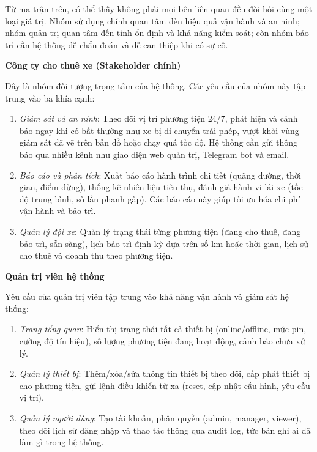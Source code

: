 \documentclass[a4paper]{extarticle}
\providecommand{\tightlist}{%
  \setlength{\itemsep}{0pt}\setlength{\parskip}{0pt}}
\begin{document}
Từ ma trận trên, có thể thấy không phải mọi bên liên quan đều đòi hỏi cùng
một loại giá trị. Nhóm sử dụng chính quan tâm đến hiệu quả vận hành và an
ninh; nhóm quản trị quan tâm đến tính ổn định và khả năng kiểm soát; còn
nhóm bảo trì cần hệ thống dễ chẩn đoán và dễ can thiệp khi có sự cố.

\textbf{Công ty cho thuê xe (Stakeholder chính)}

Đây là nhóm đối tượng trọng tâm của hệ thống. Các yêu cầu của nhóm này
tập trung vào ba khía cạnh:

\begin{enumerate}
\def\labelenumi{\arabic{enumi}.}
\tightlist
\item
  \emph{Giám sát và an ninh}: Theo dõi vị trí phương tiện 24/7, phát
  hiện và cảnh báo ngay khi có bất thường như xe bị di chuyển trái phép,
  vượt khỏi vùng giám sát đã vẽ trên bản đồ hoặc chạy quá tốc độ. Hệ
  thống cần gửi thông báo qua nhiều kênh như giao diện web quản trị,
  Telegram bot và email.
\item
  \emph{Báo cáo và phân tích}: Xuất báo cáo hành trình chi tiết (quãng
  đường, thời gian, điểm dừng), thống kê nhiên liệu tiêu thụ, đánh giá
  hành vi lái xe (tốc độ trung bình, số lần phanh gấp). Các báo cáo này
  giúp tối ưu hóa chi phí vận hành và bảo trì.
\item
  \emph{Quản lý đội xe}: Quản lý trạng thái từng phương tiện (đang cho
  thuê, đang bảo trì, sẵn sàng), lịch bảo trì định kỳ dựa trên số km
  hoặc thời gian, lịch sử cho thuê và doanh thu theo phương tiện.
\end{enumerate}

\textbf{Quản trị viên hệ thống}

Yêu cầu của quản trị viên tập trung vào khả năng vận hành và giám sát hệ
thống:

\begin{enumerate}
\def\labelenumi{\arabic{enumi}.}
\tightlist
\item
  \emph{Trang tổng quan}: Hiển thị trạng thái tất cả thiết bị
  (online/offline, mức pin, cường độ tín hiệu), số lượng phương tiện
  đang hoạt động, cảnh báo chưa xử lý.
\item
  \emph{Quản lý thiết bị}: Thêm/xóa/sửa thông tin thiết bị theo dõi, cấp
  phát thiết bị cho phương tiện, gửi lệnh điều khiển từ xa (reset, cập
  nhật cấu hình, yêu cầu vị trí).
\item
  \emph{Quản lý người dùng}: Tạo tài khoản, phân quyền (admin, manager,
  viewer), theo dõi lịch sử đăng nhập và thao tác thông qua audit log,
  tức bản ghi ai đã làm gì trong hệ thống.
\end{enumerate}
\end{document}

